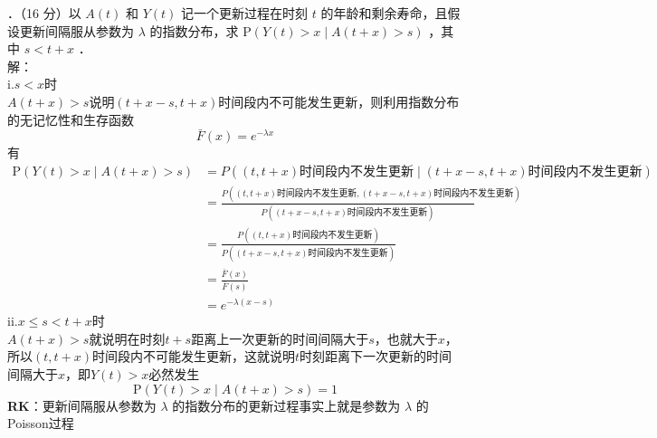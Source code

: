 \documentclass[UTF8,openany]{book}
\begin{document}
．（16 分）以 $A(t)$ 和 $Y(t)$ 记一个更新过程在时刻 $t$ 的年龄和剩余寿命，且假设更新间隔服从参数为 $\lambda$ 的指数分布，求 $\mathrm{P}(Y(t)>x \mid A(t+x)>s)$ ，其中 $s<t+x$ ．\\
解：\\
i.$s<x$时\\
$A(t+x)>s$说明$(t+x-s,t+x)$时间段内不可能发生更新，则利用指数分布的无记忆性和生存函数$$\bar{F}(x)=e^{-\lambda x}$$
有
\begin{align*}
	\mathrm{P}(Y(t)>x \mid A(t+x)>s) & =P\left( (t,t+x)\text{时间段内不发生更新}\mid (t+x-s,t+x)\text{时间段内不发生更新}\right)  \\
	& = \frac{ P\left( (t,t+x)\text{时间段内不发生更新}, (t+x-s,t+x)\text{时间段内不发生更新}\right)}{ P\left(  (t+x-s,t+x)\text{时间段内不发生更新}\right)}\\
	&=\frac{ P\left( (t,t+x)\text{时间段内不发生更新}\right)}{ P\left(  (t+x-s,t+x)\text{时间段内不发生更新}\right)}\\
	&=\frac{\bar{F}(x)}{\bar{F}(s)}\\
	&=e^{-\lambda (x-s)}
\end{align*}
ii.$x\le s<t+x$时\\
$A(t+x)>s$就说明在时刻$t+s$距离上一次更新的时间间隔大于$s$，也就大于$x$，所以$(t,t+x)$时间段内不可能发生更新，这就说明$t$时刻距离下一次更新的时间间隔大于$x$，即$Y(t)>x$必然发生
\[
\mathrm{P}(Y(t)>x \mid A(t+x)>s)=1
\]
\textbf{RK}：更新间隔服从参数为 $\lambda$ 的指数分布的更新过程事实上就是参数为 $\lambda$ 的Poisson过程\\
\end{document}
